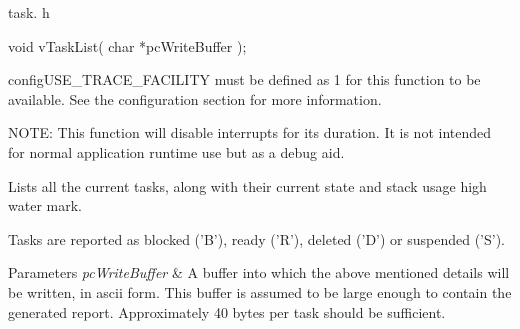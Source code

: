 task. h 
\begin{DoxyPre}void vTaskList( char *pcWriteBuffer );\end{DoxyPre}


config\-U\-S\-E\-\_\-\-T\-R\-A\-C\-E\-\_\-\-F\-A\-C\-I\-L\-I\-T\-Y must be defined as 1 for this function to be available. See the configuration section for more information.

N\-O\-T\-E\-: This function will disable interrupts for its duration. It is not intended for normal application runtime use but as a debug aid.

Lists all the current tasks, along with their current state and stack usage high water mark.

Tasks are reported as blocked ('B'), ready ('R'), deleted ('D') or suspended ('S').


\begin{DoxyParams}{Parameters}
{\em pc\-Write\-Buffer} & A buffer into which the above mentioned details will be written, in ascii form. This buffer is assumed to be large enough to contain the generated report. Approximately 40 bytes per task should be sufficient. \\
\hline
\end{DoxyParams}
